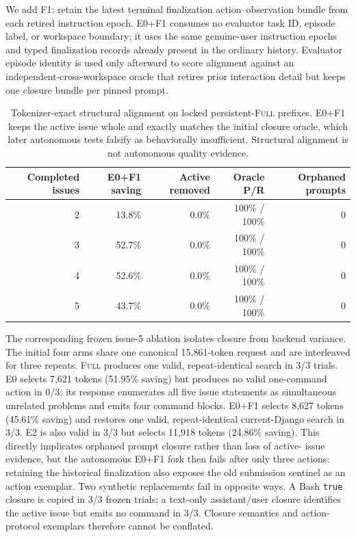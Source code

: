 \documentclass[11pt]{article}
\begin{document}
We add F1: retain the latest terminal finalization action--observation bundle
from each retired instruction epoch.  E0+F1 consumes no evaluator task ID,
episode label, or workspace boundary; it uses the same genuine-user
instruction epochs and typed finalization records already present in the
ordinary history.  Evaluator episode identity is used only afterward to score
alignment against an independent-cross-workspace oracle that retires prior
interaction detail but keeps one closure bundle per pinned prompt.

\begin{table}[H]
\centering
\small
\caption{Tokenizer-exact structural alignment on locked persistent-\textsc{Full}
prefixes.  E0+F1 keeps the active issue whole and exactly matches the initial
closure oracle, which later autonomous tests falsify as behaviorally
insufficient.  Structural alignment is not autonomous quality evidence.}
\label{tab:closure-oracle-alignment}
\begin{tabular}{rrrrr}
\toprule
Completed issues & E0+F1 saving & Active removed & Oracle P/R & Orphaned prompts \\
\midrule
2 & 13.8\% & 0.0\% & 100\% / 100\% & 0 \\
3 & 52.7\% & 0.0\% & 100\% / 100\% & 0 \\
4 & 52.6\% & 0.0\% & 100\% / 100\% & 0 \\
5 & 43.7\% & 0.0\% & 100\% / 100\% & 0 \\
\bottomrule
\end{tabular}
\end{table}

The corresponding frozen issue-5 ablation isolates closure from backend
variance.  The initial four arms share one canonical 15,861-token request and
are interleaved for three repeats.
\textsc{Full} produces one valid, repeat-identical search in 3/3 trials.  E0
selects 7,621 tokens (51.95\% saving) but produces no valid one-command action
in 0/3: its response enumerates all five issue statements as simultaneous
unrelated problems and emits four command blocks.  E0+F1 selects 8,627 tokens
(45.61\% saving) and restores one valid, repeat-identical current-Django search
in 3/3.  E2 is also valid in 3/3 but selects 11,918 tokens (24.86\% saving).
This directly implicates orphaned prompt closure rather than loss of active-
issue evidence, but the autonomous E0+F1 fork then fails after only three
actions: retaining the historical finalization also exposes the old submission
sentinel as an action exemplar.  Two synthetic replacements fail in opposite
ways.  A Bash \texttt{true} closure is copied in 3/3 frozen trials; a text-only
assistant/user closure identifies the active issue but emits no command in
3/3.  Closure semantics and action-protocol exemplars therefore cannot be
conflated.
\end{document}
